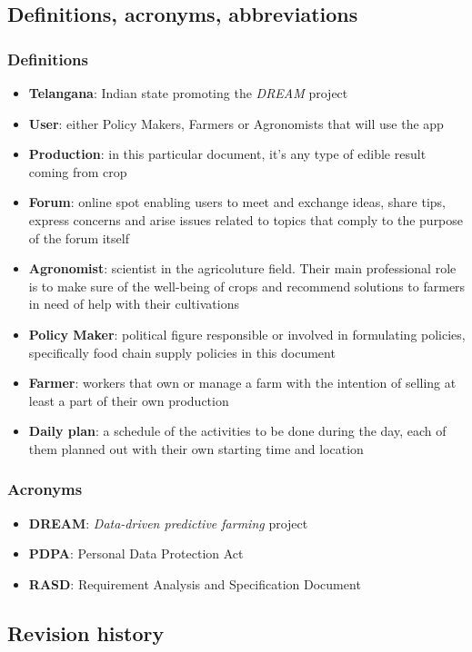 \documentclass[table, 12pt]{article}
\begin{document}
\subsection{Definitions, acronyms, abbreviations}
\subsubsection*{Definitions}
\begin{itemize}
    \item \textbf{Telangana}: Indian state promoting the \emph{DREAM} project
    \item \textbf{User}: either Policy Makers, Farmers or Agronomists that will use the app
    \item \textbf{Production}: in this particular document, it's any type of edible result coming from crop
    \item \textbf{Forum}: online spot enabling users to meet and exchange ideas, share tips, express concerns and arise issues related to topics that comply to the purpose of the forum itself
    \item \textbf{Agronomist}: scientist in the agricoluture field. Their main professional role is to make sure of the well-being of crops and recommend solutions to farmers in need of help with their cultivations 
    \item \textbf{Policy Maker}: political figure responsible or involved in formulating policies, specifically food chain supply policies in this document
    \item \textbf{Farmer}: workers that own or manage a farm with the intention of selling at least a part of their own production
    \item \textbf{Daily plan}: a schedule of the activities to be done during the day, each of them planned out with their own starting time and location
\end{itemize}
\subsubsection*{Acronyms}
\begin{itemize}
    \item \textbf{DREAM}: \emph{Data-driven predictive farming} project
    \item \textbf{PDPA}: Personal Data Protection Act 
    \item \textbf{RASD}: Requirement Analysis and Specification Document
\end{itemize}
\subsection{Revision history}
\end{document}
